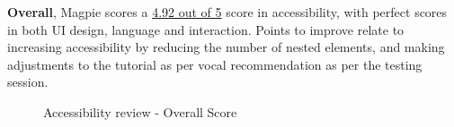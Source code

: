 \noindent \textbf{Overall}, Magpie scores a \underline{4.92 out of 5} score in accessibility, with perfect scores in both UI design, language and interaction. Points to improve relate to increasing accessibility by reducing the number of nested elements, and making adjustments to the tutorial as per vocal recommendation as per the testing session.
\begin{figure}
    \centering
    \caption{Accessibility review - Overall Score}
\end{figure}
